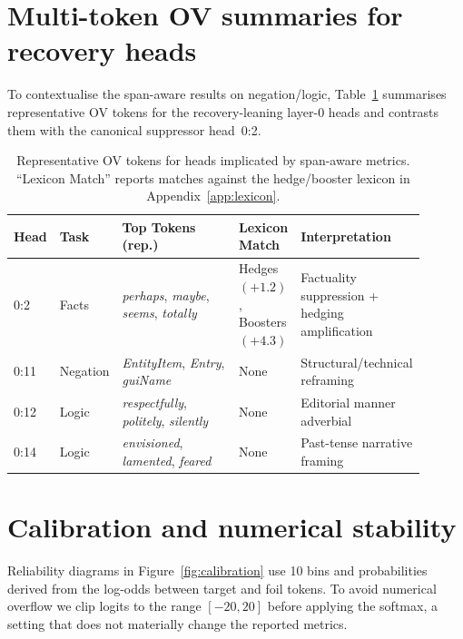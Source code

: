 \section{Multi-token OV summaries for recovery heads}
\label{app:multitoken-ov}

To contextualise the span-aware results on negation/logic, Table~\ref{tab:ov-recovery-heads} summarises representative OV tokens for the recovery-leaning layer-0 heads and contrasts them with the canonical suppressor head~0:2.

\begin{table}[h]
    \centering
    \caption{Representative OV tokens for heads implicated by span-aware metrics. ``Lexicon Match'' reports matches against the hedge/booster lexicon in Appendix~\ref{app:lexicon}.}
    \label{tab:ov-recovery-heads}
    \small
    \begin{tabular}{@{}p{0.07\linewidth}p{0.10\linewidth}p{0.40\linewidth}p{0.15\linewidth}p{0.18\linewidth}@{}}
        \toprule
        Head & Task & Top Tokens (rep.) & Lexicon Match & Interpretation \\
        \midrule
        0:2  & Facts & \emph{perhaps}, \emph{maybe}, \emph{seems}, \emph{totally} & Hedges $(+1.2)$, Boosters $(+4.3)$ & Factuality suppression + hedging amplification \\
        0:11 & Negation & \emph{EntityItem}, \emph{Entry}, \emph{guiName} & None & Structural/technical reframing \\
        0:12 & Logic & \emph{respectfully}, \emph{politely}, \emph{silently} & None & Editorial manner adverbial \\
        0:14 & Logic & \emph{envisioned}, \emph{lamented}, \emph{feared} & None & Past-tense narrative framing \\
        \bottomrule
    \end{tabular}
\end{table}

\section{Calibration and numerical stability}
\label{app:calibration}

Reliability diagrams in Figure~\ref{fig:calibration} use 10 bins and probabilities derived from the log-odds between target and foil tokens.
To avoid numerical overflow we clip logits to the range $[-20,20]$ before applying the softmax, a setting that does not materially change the reported metrics.

